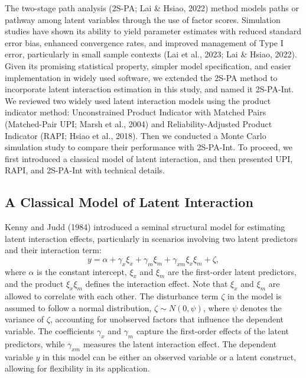 \documentclass[
  man]{apa6}
\begin{document}
The two-stage path analysis (2S-PA; Lai \& Hsiao, 2022) method models paths or pathway among latent variables through the use of factor scores. Simulation studies have shown its ability to yield parameter estimates with reduced standard error bias, enhanced convergence rates, and improved management of Type I error, particularly in small sample contexts (Lai et al., 2023; Lai \& Hsiao, 2022). Given its promising statistical property, simpler model specification, and easier implementation in widely used software, we extended the 2S-PA method to incorporate latent interaction estimation in this study, and named it 2S-PA-Int. We reviewed two widely used latent interaction models using the product indicator method: Unconstrained Product Indicator with Matched Pairs (Matched-Pair UPI; Marsh et al., 2004) and Reliability-Adjusted Product Indicator (RAPI; Hsiao et al., 2018). Then we conducted a Monte Carlo simulation study to compare their performance with 2S-PA-Int. To proceed, we first introduced a classical model of latent interaction, and then presented UPI, RAPI, and 2S-PA-Int with technical details.

\subsection{A Classical Model of Latent Interaction}\label{a-classical-model-of-latent-interaction}

Kenny and Judd (1984) introduced a seminal structural model for estimating latent interaction effects, particularly in scenarios involving two latent predictors and their interaction term:
\begin{equation}
y = \alpha + \gamma_{x}\xi_{x} + \gamma_{m}\xi_{m} + \gamma_{xm}\xi_{x}\xi_{m} + \zeta,
\end{equation}
where \(\alpha\) is the constant intercept, \(\xi_{x}\) and \(\xi_{m}\) are the first-order latent predictors, and the product \(\xi_{x}\xi_{m}\) defines the interaction effect. Note that \(\xi_{x}\) and \(\xi_{m}\) are allowed to correlate with each other. The disturbance term \(\zeta\) in the model is assumed to follow a normal distribution, \(\zeta \sim N(0, \psi)\), where \(\psi\) denotes the variance of \(\zeta\), accounting for unobserved factors that influence the dependent variable. The coefficients \(\gamma_{x}\) and \(\gamma_{m}\) capture the first-order effects of the latent predictors, while \(\gamma_{xm}\) measures the latent interaction effect. The dependent variable \(y\) in this model can be either an observed variable or a latent construct, allowing for flexibility in its application.
\end{document}
